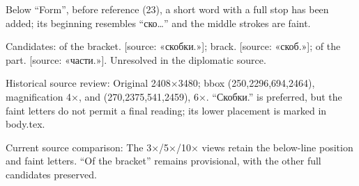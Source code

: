 Below “Form”, before reference (23), a short word with a full stop has been added; its beginning resembles “ско…” and the middle strokes are faint.\par
Candidates: of the bracket. [source: «скобки.»]; brack. [source: «скоб.»]; of the part. [source: «части.»]. Unresolved in the diplomatic source.\par
Historical source review: Original 2408×3480; bbox (250,2296,694,2464), magnification 4×, and (270,2375,541,2459), 6×. “Скобки.” is preferred, but the faint letters do not permit a final reading; its lower placement is marked in body.tex.\par
Current source comparison: The 3×/5×/10× views retain the below-line position and faint letters. “Of the bracket” remains provisional, with the other full candidates preserved.\par\medskip
